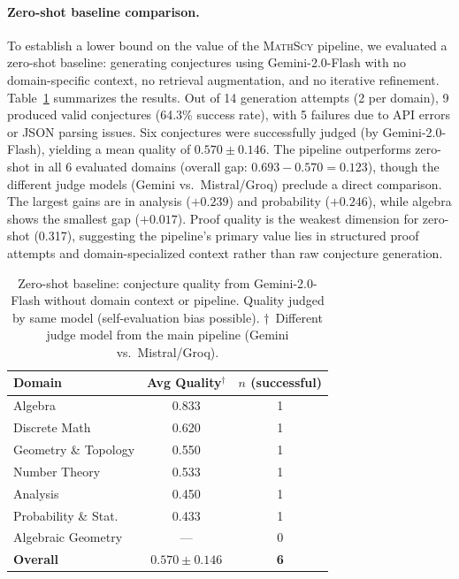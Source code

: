 \documentclass[11pt,a4paper]{article}
\newcommand{\mathscy}{\textsc{MathScy}}
\begin{document}
\paragraph{Zero-shot baseline comparison.}
To establish a lower bound on the value of the \mathscy{} pipeline, we evaluated a zero-shot baseline: generating conjectures using Gemini-2.0-Flash with no domain-specific context, no retrieval augmentation, and no iterative refinement. Table~\ref{tab:zero_shot_baseline} summarizes the results. Out of 14 generation attempts (2 per domain), 9 produced valid conjectures (64.3\% success rate), with 5 failures due to API errors or JSON parsing issues. Six conjectures were successfully judged (by Gemini-2.0-Flash), yielding a mean quality of $0.570 \pm 0.146$. The pipeline outperforms zero-shot in all 6 evaluated domains (overall gap: $0.693 - 0.570 = 0.123$), though the different judge models (Gemini vs.\ Mistral/Groq) preclude a direct comparison. The largest gains are in analysis ($+0.239$) and probability ($+0.246$), while algebra shows the smallest gap ($+0.017$). Proof quality is the weakest dimension for zero-shot (0.317), suggesting the pipeline's primary value lies in structured proof attempts and domain-specialized context rather than raw conjecture generation.

\begin{table}[h]
\centering
\caption{Zero-shot baseline: conjecture quality from Gemini-2.0-Flash without domain context or pipeline. Quality judged by same model (self-evaluation bias possible). $\dagger$~Different judge model from the main pipeline (Gemini vs.\ Mistral/Groq).}
\label{tab:zero_shot_baseline}
\small
\begin{tabular}{@{}lcc@{}}
\toprule
\textbf{Domain} & \textbf{Avg Quality$^\dagger$} & \textbf{$n$ (successful)} \\
\midrule
Algebra                & 0.833 & 1 \\
Discrete Math          & 0.620 & 1 \\
Geometry \& Topology   & 0.550 & 1 \\
Number Theory          & 0.533 & 1 \\
Analysis               & 0.450 & 1 \\
Probability \& Stat.   & 0.433 & 1 \\
Algebraic Geometry     & ---   & 0 \\
\midrule
\textbf{Overall}       & $\mathbf{0.570 \pm 0.146}$ & \textbf{6} \\
\bottomrule
\end{tabular}
\end{table}
\end{document}
